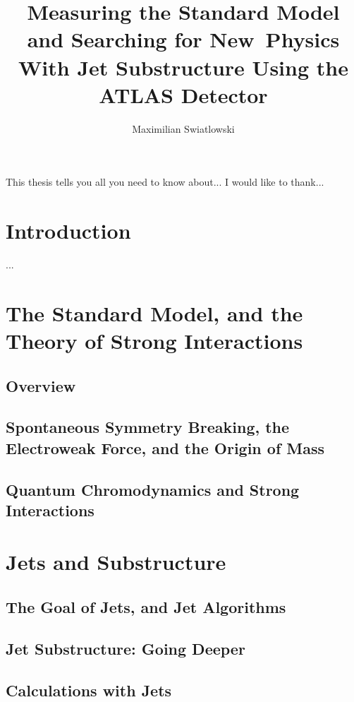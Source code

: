 \documentclass{report}
\begin{document}
\title{Measuring the Standard Model and Searching for New~Physics 
        With Jet Substructure Using the ATLAS Detector}
\author{Maximilian Swiatlowski}

 
\beforepreface
{}
    This thesis tells you all you need to know about...
    I would like to thank...
\afterpreface
 
\chapter{Introduction}
         ...

\chapter{The Standard Model, and the Theory of Strong Interactions}
\section{Overview}
\section{Spontaneous Symmetry Breaking, the Electroweak Force, and the Origin of Mass}
\section{Quantum Chromodynamics and Strong Interactions}

\chapter{Jets and Substructure}
\label{chapter:jets-and-substructure}
\section{The Goal of Jets, and Jet Algorithms}
\section{Jet Substructure: Going Deeper}
\section{Calculations with Jets}
\end{document}
